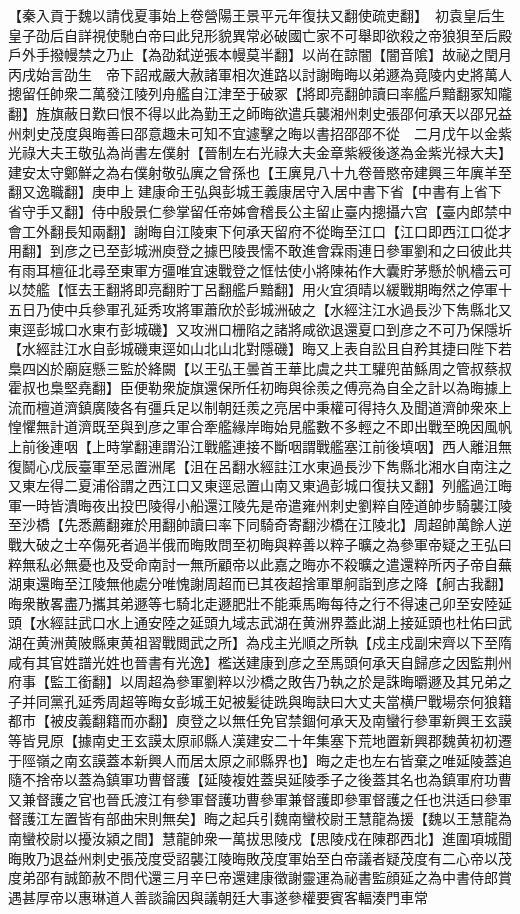 【秦入貢于魏以請伐夏事始上卷營陽王景平元年復扶又翻使疏吏翻】　初袁皇后生皇子劭后自詳視使馳白帝曰此兒形貌異常必破國亡家不可舉即欲殺之帝狼狽至后殿戶外手撥幔禁之乃止【為劭弑逆張本幔莫半翻】以尚在諒闇【闇音隂】故祕之閏月丙戌始言劭生　帝下詔戒嚴大赦諸軍相次進路以討謝晦晦以弟遯為竟陵内史將萬人摠留任帥衆二萬發江陵列舟艦自江津至于破冢【將即亮翻帥讀曰率艦戶黯翻冢知隴翻】旌旗蔽日歎曰恨不得以此為勤王之師晦欲遣兵襲湘州刺史張邵何承天以邵兄益州刺史茂度與晦善曰邵意趣未可知不宜遽擊之晦以書招邵邵不從　二月戊午以金紫光祿大夫王敬弘為尚書左僕射【晉制左右光祿大夫金章紫綬後遂為金紫光禄大夫】建安太守鄭鮮之為右僕射敬弘廙之曾孫也【王廙見八十九卷晉愍帝建興三年廙羊至翻又逸職翻】庚申上建康命王弘與彭城王義康居守入居中書下省【中書有上省下省守手又翻】侍中殷景仁參掌留任帝姊會稽長公主留止臺内摠攝六宫【臺内郎禁中會工外翻長知兩翻】謝晦自江陵東下何承天留府不從晦至江口【江口即西江口從才用翻】到彦之已至彭城洲庾登之據巴陵畏懦不敢進會霖雨連日參軍劉和之曰彼此共有雨耳檀征北尋至東軍方彊唯宜速戰登之恇怯使小將陳祐作大囊貯茅懸於帆檣云可以焚艦【恇去王翻將即亮翻貯丁呂翻艦戶黯翻】用火宜須晴以緩戰期晦然之停軍十五日乃使中兵參軍孔延秀攻將軍蕭欣於彭城洲破之【水經注江水過長沙下雋縣北又東逕彭城口水東冇彭城磯】又攻洲口栅陷之諸將咸欲退還夏口到彦之不可乃保隱圻【水經註江水自彭城磯東逕如山北山北對隱磯】晦又上表自訟且自矜其捷曰陛下若梟四凶於廟庭懸三監於絳闕【以王弘王曇首王華比虞之共工驩兜苗鯀周之管叔蔡叔霍叔也梟堅堯翻】臣便勒衆旋旗還保所任初晦與徐羨之傅亮為自全之計以為晦據上流而檀道濟鎮廣陵各有彊兵足以制朝廷羨之亮居中秉權可得持久及聞道濟帥衆來上惶懼無計道濟既至與到彦之軍合牽艦緣岸晦始見艦數不多輕之不即出戰至晩因風帆上前後連咽【上時掌翻連謂沿江戰艦連接不斷咽謂戰艦塞江前後填咽】西人離沮無復鬬心戊辰臺軍至忌置洲尾【沮在呂翻水經註江水東過長沙下雋縣北湘水自南注之又東左得二夏浦俗謂之西江口又東逕忌置山南又東過彭城口復扶又翻】列艦過江晦軍一時皆潰晦夜出投巴陵得小船還江陵先是帝遣雍州刺史劉粹自陸道帥步騎襲江陵至沙橋【先悉薦翻雍於用翻帥讀曰率下同騎奇寄翻沙橋在江陵北】周超帥萬餘人逆戰大破之士卒傷死者過半俄而晦敗問至初晦與粹善以粹子曠之為參軍帝疑之王弘曰粹無私必無憂也及受命南討一無所顧帝以此嘉之晦亦不殺曠之遣還粹所丙子帝自蕪湖東還晦至江陵無他處分唯愧謝周超而已其夜超捨軍單舸詣到彦之降【舸古我翻】晦衆散畧盡乃攜其弟遯等七騎北走遯肥壯不能乘馬晦每待之行不得速己卯至安陸延頭【水經註武口水上通安陸之延頭九域志武湖在黄洲界蓋此湖上接延頭也杜佑曰武湖在黄洲黄陂縣東黄祖習戰閲武之所】為戍主光順之所執【戍主戍副宋齊以下至隋咸有其官姓譜光姓也晉書有光逸】檻送建康到彦之至馬頭何承天自歸彦之因監荆州府事【監工銜翻】以周超為參軍劉粹以沙橋之敗告乃執之於是誅晦㬭遯及其兄弟之子并同黨孔延秀周超等晦女彭城王妃被髪徒跣與晦訣曰大丈夫當横尸戰場奈何狼籍都市【被皮義翻籍而亦翻】庾登之以無任免官禁錮何承天及南蠻行參軍新興王玄謨等皆見原【據南史王玄謨太原祁縣人漢建安二十年集塞下荒地置新興郡魏黄初初遷于陘嶺之南玄謨蓋本新興人而居太原之祁縣界也】晦之走也左右皆棄之唯延陵蓋追隨不捨帝以蓋為鎮軍功曹督護【延陵複姓蓋吳延陵季子之後蓋其名也為鎮軍府功曹又兼督護之官也晉氏渡江有參軍督護功曹參軍兼督護即參軍督護之任也洪适曰參軍督護江左置皆有部曲宋則無矣】晦之起兵引魏南蠻校尉王慧龍為援【魏以王慧龍為南蠻校尉以擾汝潁之間】慧龍帥衆一萬拔思陵戍【思陵戍在陳郡西北】進圍項城聞晦敗乃退益州刺史張茂度受詔襲江陵晦敗茂度軍始至白帝議者疑茂度有二心帝以茂度弟邵有誠節赦不問代還三月辛巳帝還建康徵謝靈運為祕書監顔延之為中書侍郎賞遇甚厚帝以惠琳道人善談論因與議朝廷大事遂參權要賓客輻湊門車常